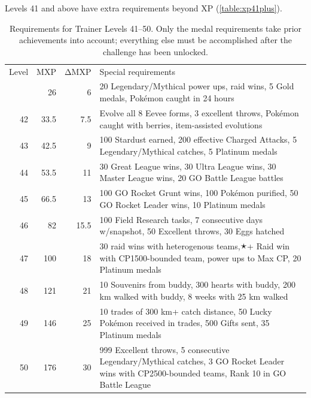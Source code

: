 Levels 41 and above have extra requirements beyond XP (\autoref{table:xp41plus}).
\begin{table}
\centering
  \begin{tabular}{rrrp{}}
Level & MXP & ΔMXP & Special requirements \\
\Midrule
41 & 26 & 6 & 20 Legendary/Mythical power ups,\newline
                      30 raid wins, 5 Gold medals,\newline
                      200 Pokémon caught in 24 hours\\
42 & 33.5 & 7.5 & Evolve all 8 Eevee forms, 3 excellent throws,\newline
                      200 Pokémon caught with berries,\newline
                      15 item-assisted evolutions\\
43 & 42.5 & 9 & 100 Stardust earned,
                      200 effective Charged Attacks,
                      5 Legendary/Mythical catches,
                      5 Platinum medals \\
44 & 53.5 & 11 & 30 Great League wins,
                       30 Ultra League wins,
                       30 Master League wins,
                       20 GO Battle League battles \\
45 & 66.5 & 13 & 100 GO Rocket Grunt wins,
                       100 Pokémon purified,
                       50 GO Rocket Leader wins,
                       10 Platinum medals\\
46 & 82 & 15.5 & 100 Field Research tasks,
                       7 consecutive days w/snapshot,
                       50 Excellent throws,
                       30 Eggs hatched\\
47 & 100 & 18 & 30 raid wins with heterogenous teams,\newline
                        3🟉+ Raid win with CP1500-bounded team,\newline
                        3 power ups to Max CP, 20 Platinum medals\\
48 & 121 & 21 & 10 Souvenirs from buddy,
                        300 hearts with buddy,
                        200 km walked with buddy,
                        8 weeks with 25 km walked\\
49 & 146 & 25 & 10 trades of 300 km+ catch distance,
                        50 Lucky Pokémon received in trades,
                        500 Gifts sent,
                        35 Platinum medals\\
50 & 176 & 30 & 999 Excellent throws,
                        5 consecutive Legendary/Mythical catches,
                        3 GO Rocket Leader wins with CP2500-bounded teams,
                        Rank 10 in GO Battle League\\
\end{tabular}
\caption[Requirements for Trainer Levels 41--50]{Requirements for Trainer Levels 41--50.
   Only the medal requirements take prior achievements into account; everything else
   must be accomplished after the challenge has been unlocked.\label{table:xp41plus}}
\end{table}
